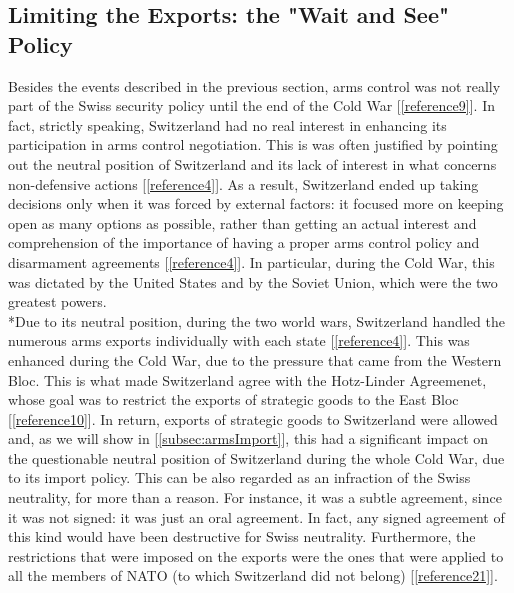 \documentclass[a4paper]{article}
\begin{document}
\subsection{Limiting the Exports: the "Wait and See" Policy}
Besides the events described in the previous section, arms control was not really part of the Swiss security policy until the end of the Cold War [\ref{reference9}]. In fact, strictly speaking, Switzerland had no real interest in enhancing its participation in arms control negotiation. This is was often justified by pointing out the neutral position of Switzerland and its lack of interest in what concerns non-defensive actions [\ref{reference4}]. As a result, Switzerland ended up taking decisions only when it was forced by external factors: it focused more on keeping open as many options as possible, rather than getting an actual interest and comprehension of the importance of having a proper arms control policy and disarmament agreements [\ref{reference4}]. In particular, during the Cold War, this was dictated by the United States and by the Soviet Union, which were the two greatest powers.
\\*Due to its neutral position, during the two world wars, Switzerland handled the numerous arms exports individually with each state [\ref{reference4}]. This was enhanced during the Cold War, due to the pressure that came from the Western Bloc. This is what made Switzerland agree with the Hotz-Linder Agreemenet, whose goal was to restrict the exports of strategic goods to the East Bloc [\ref{reference10}]. In return, exports of strategic goods to Switzerland were allowed and, as we will show in [\ref{subsec:armsImport}], this had a significant impact on the questionable neutral position of Switzerland during the whole Cold War, due to its import policy. This can be also regarded as an infraction of the Swiss neutrality, for more than a reason. For instance, it was a subtle agreement, since it was not signed: it was just an oral agreement. In fact, any signed agreement of this kind would have been destructive for Swiss neutrality. Furthermore, the restrictions that were imposed on the exports were the ones that were applied to all the members of NATO (to which Switzerland did not belong) [\ref{reference21}].
\end{document}

